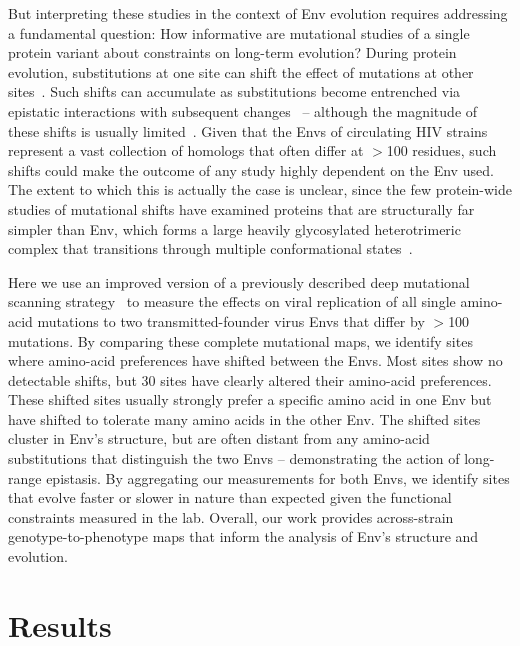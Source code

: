 \documentclass[9pt]{elife}
\begin{document}
But interpreting these studies in the context of Env evolution requires addressing a fundamental question: How informative are mutational studies of a single protein variant about constraints on long-term evolution?
During protein evolution, substitutions at one site can shift the effect of mutations at other sites~\citep{natarajan2013epistasis,gong2013stability,harms2014historical,podgornaia2015pervasive,starr2016epistasis}.
Such shifts can accumulate as substitutions become entrenched via epistatic interactions with subsequent changes~\citep{starr2017pervasive,pollock2012amino,shah2015contingency,bazykin2015changing} -- although the magnitude of these shifts is usually limited~\citep{doud2015site,chan2017correlation,ashenberg2013mutational,risso2014mutational}.
Given that the Envs of circulating HIV strains represent a vast collection of homologs that often differ at $>$100 residues, such shifts could make the outcome of any study highly dependent on the Env used.
The extent to which this is actually the case is unclear, since the few protein-wide studies of mutational shifts have examined proteins that are structurally far simpler than Env, which forms a large heavily glycosylated heterotrimeric complex that transitions through multiple conformational states~\citep{munro2014conformational,ozorowski2017open}.

Here we use an improved version of a previously described deep mutational scanning strategy~\citep{haddox2016experimental} to measure the effects on viral replication of all single amino-acid mutations to two transmitted-founder virus Envs that differ by $>$100 mutations.
By comparing these complete mutational maps, we identify sites where amino-acid preferences have shifted between the Envs.
Most sites show no detectable shifts, but 30 sites have clearly altered their amino-acid preferences.
These shifted sites usually strongly prefer a specific amino acid in one Env but have shifted to tolerate many amino acids in the other Env.
The shifted sites cluster in Env's structure, but are often distant from any amino-acid substitutions that distinguish the two Envs -- demonstrating the action of long-range epistasis.
By aggregating our measurements for both Envs, we identify sites that evolve faster or slower in nature than expected given the functional constraints measured in the lab.
Overall, our work provides across-strain genotype-to-phenotype maps that inform the analysis of Env's structure and evolution.

\section{Results}
\end{document}
